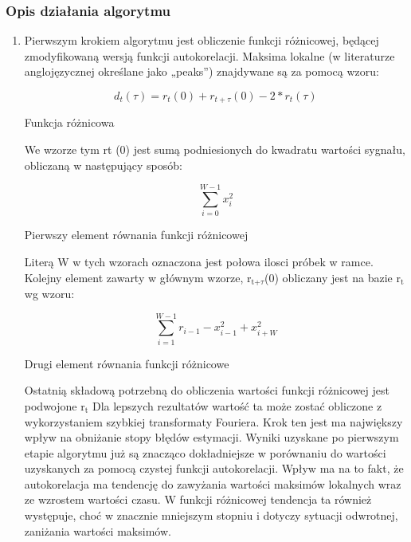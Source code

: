 \documentclass[a4paper,12 pt]{article}
\begin{document}
\subsubsection{Opis działania algorytmu}
\begin{enumerate}
\item Pierwszym krokiem algorytmu jest obliczenie funkcji różnicowej, będącej zmodyfikowaną wersją funkcji autokorelacji. Maksima lokalne (w literaturze anglojęzycznej określane jako „peaks”) znajdywane są za pomocą wzoru:

\begin{mycapequ}[h]

\begin{equation}
d_{t}(\tau)=r_{t}(0)+r_{t+\tau}(0) - 2*r_{t}(\tau)       
\end{equation}
\caption{Funkcja różnicowa}
\end{mycapequ} 
\FloatBarrier
We wzorze tym  rt (0) jest sumą podniesionych do kwadratu wartości sygnału, obliczaną w następujący sposób:

\begin{mycapequ}[h]
\begin{equation}
\sum\limits_{i=0}^{W-1} x_{i}^2
\end{equation}
\caption{Pierwszy element równania funkcji różnicowej}
\end{mycapequ} 
\FloatBarrier

Literą W w tych wzorach oznaczona jest połowa ilosci próbek w ramce. Kolejny element zawarty w głównym wzorze, r$_{\text{t+$\tau$}}$(0) obliczany jest na bazie r$_{\text{t}}$ wg wzoru:

\begin{mycapequ}[h]
\begin{equation}
\sum\limits_{i=1}^{W-1} r_{i-1}-x_{i-1}^2+x_{i+W}^2
\end{equation}
\caption{Drugi element równania funkcji różnicowe}
\end{mycapequ} 
\FloatBarrier
Ostatnią składową potrzebną do obliczenia wartości funkcji różnicowej jest podwojone  r$_{\text{t}}$
Dla lepszych rezultatów wartość ta może zostać obliczone z wykorzystaniem szybkiej transformaty Fouriera.
Krok ten jest ma największy wpływ na obniżanie stopy błędów estymacji. Wyniki uzyskane po pierwszym etapie algorytmu już są znacząco dokładniejsze w porównaniu do wartości uzyskanych za pomocą czystej funkcji autokorelacji. Wpływ ma na to fakt, że autokorelacja ma tendencję do zawyżania wartości maksimów lokalnych wraz ze wzrostem wartości czasu. W funkcji różnicowej tendencja ta również występuje, choć w znacznie mniejszym stopniu i dotyczy sytuacji odwrotnej, zaniżania wartości maksimów.


\end{enumerate}
\end{document}
